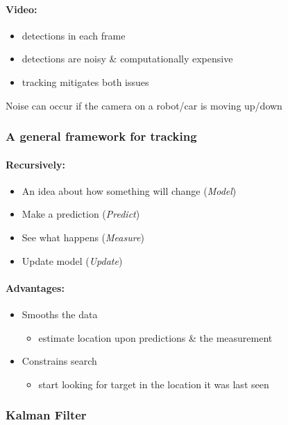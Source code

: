 \documentclass[paper=a4, fontsize=11pt]{article} %
\numberwithin{equation}{section} %
\numberwithin{figure}{section} %
\numberwithin{table}{section} %
\begin{document}
\paragraph{Video:}
\begin{itemize}
\item detections in each frame
\item detections are noisy \& computationally expensive
\item tracking mitigates both issues
\end{itemize}

Noise can occur if the camera on a robot/car is moving up/down

\subsubsection{A general framework for tracking}

\paragraph{Recursively:}
\begin{itemize}
\item An idea about how something will change (\textit{Model})
\item Make a prediction (\textit{Predict})
\item See what happens (\textit{Measure})
\item Update model (\textit{Update})
\end{itemize}

\paragraph{Advantages:}
\begin{itemize}
\item Smooths the data 
	\begin{itemize}
	\item	estimate location upon predictions  \& the measurement
	\end{itemize}
\item Constrains search
	\begin{itemize}
	\item start looking for target in the location it was last seen		
	\end{itemize}
\end{itemize}

\subsubsection{Kalman Filter}
\end{document}
